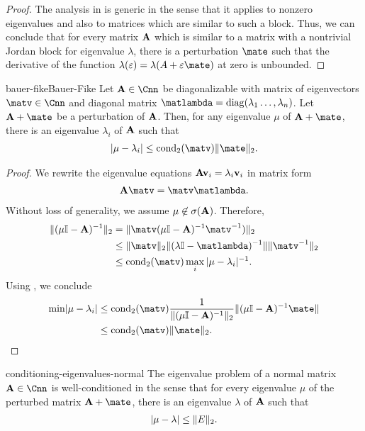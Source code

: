 \begin{proof}
  The analysis in  is
  generic in the sense that it applies to nonzero eigenvalues and also
  to matrices which are similar to such a block. Thus, we can conclude
  that for every matrix $\mathbf A$ which is similar to a matrix with a
  nontrivial Jordan block for eigenvalue $\lambda$, there is a
  perturbation $\mate$ such that the derivative of the function
  $\lambda(\epsilon) = \lambda(A+\epsilon\mate)$ at zero is unbounded.
\end{proof}

\begin{Theorem*}{bauer-fike}{Bauer-Fike}
  Let $\mata\in \Cnn$ be diagonalizable with matrix of eigenvectors
  $\matv \in \Cnn$ and diagonal matrix
  $\matlambda = \diag(\lambda_1\dots,\lambda_n)$. Let $\mata+\mate$ be
  a perturbation of $\mathbf A$. Then, for any eigenvalue $\mu$ of
  $\mata+\mate$, there is an eigenvalue $\lambda_i$ of $\mathbf A$ such
  that
  \begin{gather}
    \abs{\mu-\lambda_i} \le \cond_2(\matv) \norm{\mate}_2.
  \end{gather}
\end{Theorem*}

\begin{proof}
  We rewrite the eigenvalue equations $\mathbf A\mathbf v_i = \lambda_i \mathbf v_i$ in matrix form
  \begin{gather}
    \mata\matv = \matv \matlambda.
  \end{gather}
  Without loss of generality, we assume $\mu \not\in\sigma(\mathbf A)$. Therefore,
  \begin{align}
    \norm{(\mu\id-\mata)^{-1}}_2
    &= \norm{\matv(\mu\id-\mata)^{-1}\matv^{-1})}_2\\
    & \le \norm{\matv}_2\norm{(\lambda\id-\matlambda)^{-1}}\norm{\matv^{-1}}_2\\
    &\le \cond_2(\matv) \max_i{\abs{\mu-\lambda_i}^{-1}}.
  \end{align}
  Using , we conclude
  \begin{align}
    \min\abs{\mu-\lambda_i}
    &\le \cond_2(\matv) \frac1{\norm{(\mu\id-\mata)^{-1}}_2} \norm{(\mu\id-\mata)^{-1}\mate}\\
    & \le \cond_2(\matv)\norm{\mate}_2.
  \end{align}
\end{proof}

\begin{Corollary}{conditioning-eigenvalues-normal}
  The eigenvalue problem of a normal matrix $\mata\in\Cnn$ is
  well-conditioned in the sense that for every eigenvalue $\mu$ of the
  perturbed matrix $\mata+\mate$, there is an eigenvalue $\lambda$ of
  $\mathbf A$ such that
  \begin{gather}
    \lvert\mu-\lambda\rvert \le \lVert E\rVert_2.
  \end{gather}
\end{Corollary}

